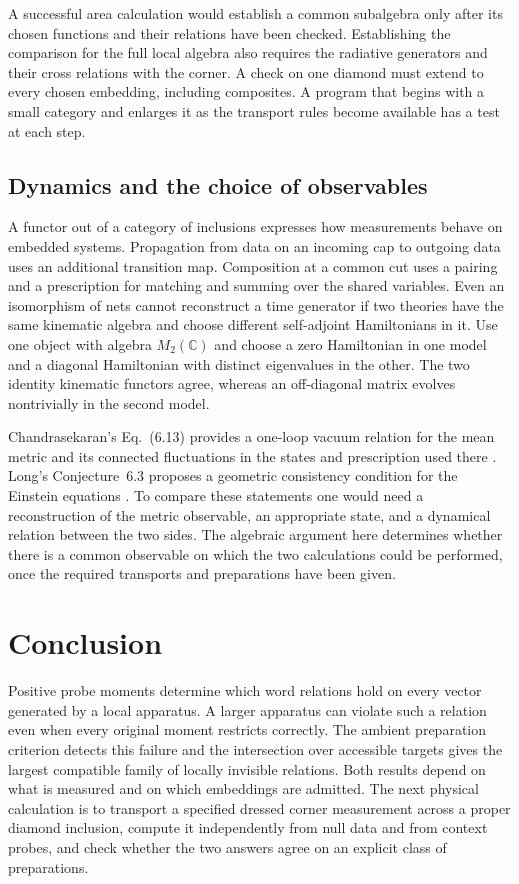 \documentclass[11pt,letterpaper]{article}
\begin{document}
A successful area calculation would establish a common subalgebra only after its chosen functions and their relations have been checked. Establishing the comparison for the full local algebra also requires the radiative generators and their cross relations with the corner. A check on one diamond must extend to every chosen embedding, including composites. A program that begins with a small category and enlarges it as the transport rules become available has a test at each step.

\subsection{Dynamics and the choice of observables}

A functor out of a category of inclusions expresses how measurements behave on embedded systems. Propagation from data on an incoming cap to outgoing data uses an additional transition map. Composition at a common cut uses a pairing and a prescription for matching and summing over the shared variables. Even an isomorphism of nets cannot reconstruct a time generator if two theories have the same kinematic algebra and choose different self-adjoint Hamiltonians in it. Use one object with algebra $M_2(\mathbb C)$ and choose a zero Hamiltonian in one model and a diagonal Hamiltonian with distinct eigenvalues in the other. The two identity kinematic functors agree, whereas an off-diagonal matrix evolves nontrivially in the second model.

Chandrasekaran's Eq.~(6.13) provides a one-loop vacuum relation for the mean metric and its connected fluctuations in the states and prescription used there \cite[Sec.~6.2]{nc}. Long's Conjecture~6.3 proposes a geometric consistency condition for the Einstein equations \cite{long}. To compare these statements one would need a reconstruction of the metric observable, an appropriate state, and a dynamical relation between the two sides. The algebraic argument here determines whether there is a common observable on which the two calculations could be performed, once the required transports and preparations have been given.

\section{Conclusion}

Positive probe moments determine which word relations hold on every vector generated by a local apparatus. A larger apparatus can violate such a relation even when every original moment restricts correctly. The ambient preparation criterion detects this failure and the intersection over accessible targets gives the largest compatible family of locally invisible relations. Both results depend on what is measured and on which embeddings are admitted. The next physical calculation is to transport a specified dressed corner measurement across a proper diamond inclusion, compute it independently from null data and from context probes, and check whether the two answers agree on an explicit class of preparations.
\end{document}
